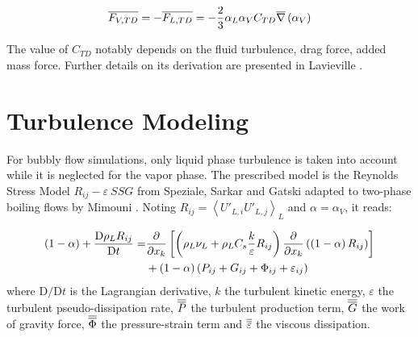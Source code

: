 \begin{equation}
\overline{F_{V,TD}}=-\overline{F_{L,TD}}=-\frac{2}{3}\alpha_{L}\alpha_{V}C_{TD}\overline{\nabla}\left({\alpha_{V}}\right)
\label{eq:ncfd_turb_disp}
\end{equation}

The value of $C_{TD}$ notably depends on the fluid turbulence, drag force, added mass force. Further details on its derivation are presented in Lavieville \etal \cite{lavieville_generalized_2017}.



\section{Turbulence Modeling}
\label{subsec:turbulence}

%

For bubbly flow simulations, only liquid phase turbulence is taken into account while it is neglected for the vapor phase. The prescribed model is the Reynolds Stress Model $R_{ij}-\varepsilon~SSG$ from Speziale, Sarkar and Gatski \cite{speziale_modelling_1991} adapted to two-phase boiling flows by Mimouni \etal\cite{mimouni_combined_2011}. Noting $R_{ij} = \left< U'_{L,i}U'_{L,j} \right>_{L}$ and $\alpha = \alpha_{V}$, it reads:

\begin{align}
\left( 1-\alpha \right)+\frac{\mathrm{D}\rho_{L}R_{ij}}{\mathrm{D}t}  = & \frac{\partial}{\partial x_{k}}\left[  \left( \rho_{L}\nu_{L} + \rho_{L}C_{s} \frac{k}{\varepsilon}R_{ij} \right) \frac{\partial}{\partial x_{k}}\left(  \left( 1-\alpha \right) R_{ij}  \right)  \right] \\
&+ \left( 1 - \alpha \right)\left( P_{ij} + G_{ij} + \Phi_{ij} + \varepsilon_{ij} \right)
\end{align}
where $\mathrm{D}/\mathrm{D}t$ is the Lagrangian derivative, $k$ the turbulent kinetic energy, $\varepsilon$ the turbulent pseudo-dissipation rate, $\overline{\overline{P}}$ the turbulent production term, $\overline{\overline{G}}$ the work of gravity force, $\overline{\overline{\Phi}}$ the pressure-strain term and $\overline{\overline{\varepsilon}}$ the viscous dissipation.

